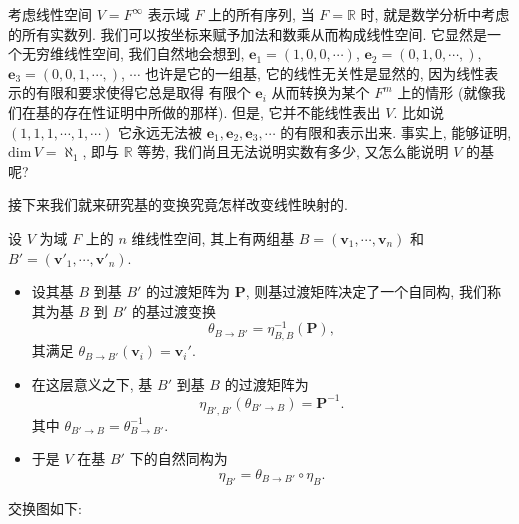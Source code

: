 \documentclass[UTF8]{book}
\begin{document}
\begin{example}
    考虑线性空间 $V= F^{\infty}$ 表示域 $F$ 上的所有序列, 
    当 $F =\mathbb{R}$ 时, 就是数学分析中考虑的所有实数列. 
    我们可以按坐标来赋予加法和数乘从而构成线性空间. 
    它显然是一个无穷维线性空间, 我们自然地会想到, 
    $\boldsymbol{e}_1=(1,0,0,\cdots)$, 
    $\boldsymbol{e}_2=(0,1,0,\cdots,)$, 
    $\boldsymbol{e}_3=(0,0,1,\cdots,)$, $\cdots$ 也许是它的一组基, 
    它的线性无关性是显然的, 因为线性表示的有限和要求使得它总是取得
    有限个 $\boldsymbol{e}_i$ 从而转换为某个 $F^m$ 上的情形 
    (就像我们在基的存在性证明中所做的那样). 
    但是, 它并不能线性表出 $V$. 
    比如说 $(1,1,1,\cdots,1,\cdots)$ 它永远无法被 
    $\boldsymbol{e}_1,\boldsymbol{e}_2,\boldsymbol{e}_3,\cdots$ 
    的有限和表示出来. 
    事实上, 能够证明, $\mathrm{dim}\,V = \aleph_1$, 
    即与 $\mathbb{R}$ 等势, 我们尚且无法说明实数有多少, 
    又怎么能说明 $V$ 的基呢? 
\end{example}

接下来我们就来研究基的变换究竟怎样改变线性映射的. 

\begin{lemma}
    设 $V$ 为域 $F$ 上的 $n$ 维线性空间, 其上有两组基 
    $B=(\boldsymbol{v}_1,\cdots,\boldsymbol{v}_n)$ 
    和 $B'=(\boldsymbol{v}'_1,\cdots,\boldsymbol{v}'_n)$.
    
    \begin{itemize}
        \item 设其基 $B$ 到基 $B'$ 的过渡矩阵为 $\boldsymbol{P}$, 
        则基过渡矩阵决定了一个自同构, 
        我们称其为基 $B$ 到 $B'$ 的基过渡变换 
        $$\theta_{B \to B'} = \eta_{B,B}^{-1}(\boldsymbol{P}),$$
        其满足 $\theta_{B \to B'}(\boldsymbol{v}_i) = \boldsymbol{v}_i'$. 
        
        \item 在这层意义之下, 基 $B'$ 到基 $B$ 的过渡矩阵为 
        $$\eta_{B',B'}(\theta_{B' \to B})=\boldsymbol{P}^{-1}.$$ 
        其中 $\theta_{B' \to B} = \theta_{B \to B'}^{-1}$. 

        \item 于是 $V$ 在基 $B'$ 下的自然同构为 
        $$\eta_{B'} = \theta_{B \to B'} \circ \eta_{B}. $$
    \end{itemize}

    交换图如下: 
    \begin{center}
    \end{center}
\end{lemma}
\end{document}
